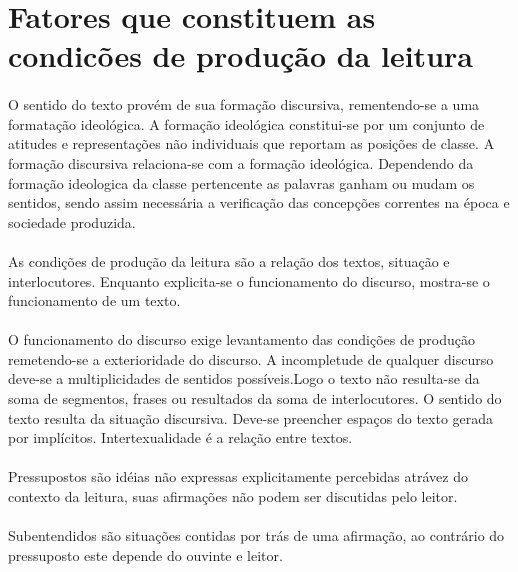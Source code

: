 \section{Fatores que constituem as condicões de produção da leitura}

\paragraph{}

O sentido do texto provém de sua formação discursiva, rementendo-se a uma formatação ideológica. A formação ideológica constitui-se por um conjunto de atitudes e representações não individuais que reportam as posições de classe. A formação discursiva relaciona-se com a formação ideológica. Dependendo da formação ideologica da classe pertencente as palavras ganham ou mudam os sentidos, sendo assim necessária a verificação das concepções correntes na época e sociedade produzida.

\paragraph{}

As condições de produção da leitura são a relação dos textos, situação e interlocutores. Enquanto explicita-se o funcionamento do discurso, mostra-se o funcionamento de um texto.

\paragraph{}

O funcionamento do discurso exige levantamento das condições de produção remetendo-se a exterioridade do discurso. A incompletude de qualquer discurso deve-se a multiplicidades de sentidos possíveis.Logo o texto não resulta-se da soma de segmentos, frases ou resultados da soma de interlocutores. O sentido do texto resulta da situação discursiva. Deve-se preencher espaços do texto gerada por implícitos. Intertexualidade é a relação entre textos.
\paragraph{}
Pressupostos são idéias não expressas explicitamente percebidas atrávez do contexto da leitura, suas afirmações não podem ser discutidas pelo leitor.
\paragraph{}
Subentendidos são situações contidas por trás de uma afirmação, ao contrário do pressuposto este depende do ouvinte e leitor.
